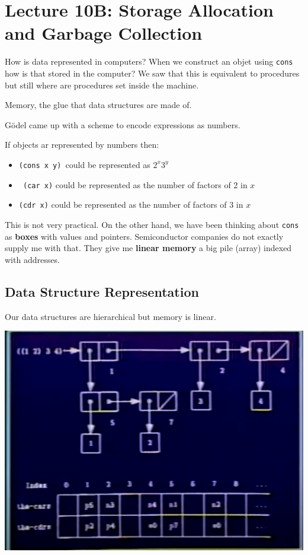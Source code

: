 \documentclass[a4paper,twoside]{article}
\numberwithin{equation}{section}
\begin{document}
\section{Lecture 10B: Storage Allocation and Garbage Collection}
How is data represented in computers? When we construct an objet using \texttt{cons} how is that
stored in the computer? We saw that this is equivalent to procedures but still where are procedures set
inside the machine.

\begin{center}
    Memory, the glue that data structures are made of.
\end{center}
Gödel came up with a scheme to encode expressions as numbers.

If objects ar represented by numbers then:
\begin{itemize}
    \item \texttt{(cons x y) }could be represented as $2^x 3^y$
    \item \texttt{ (car x)} could be represented as the number of factors of $2$ in $x$
    \item \texttt{(cdr x)} could be represented as the number of factors of $3$ in $x$
\end{itemize}
This is not very practical. On the other hand, we have been thinking about \texttt{cons} as
\textbf{boxes} with values and pointers. Semiconductor companies do not exactly supply me with that.
They give me \textbf{linear memory} a big pile (array) indexed with addresses.

\subsection{Data Structure Representation}
Our data structures are hierarchical but memory is linear.
\begin{center}
    \includegraphics[scale = 0.2]{assets/memory_array.png}
\end{center}
\end{document}
